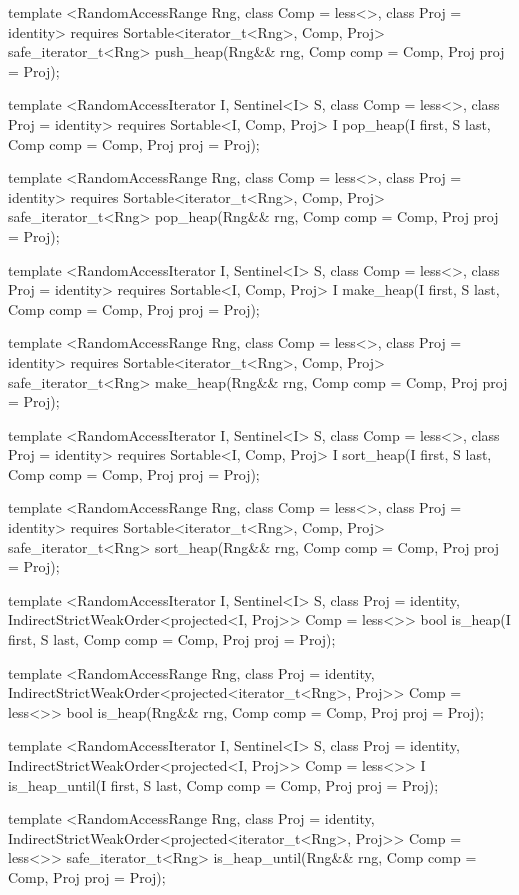 \begin{codeblock}
{{{{  template <RandomAccessRange Rng, class Comp = less<>, class Proj = identity>
    requires Sortable<iterator_t<Rng>, Comp, Proj>
    safe_iterator_t<Rng>
      push_heap(Rng&& rng, Comp comp = Comp{}, Proj proj = Proj{});

  template <RandomAccessIterator I, Sentinel<I> S, class Comp = less<>,
      class Proj = identity>
    requires Sortable<I, Comp, Proj>
    I pop_heap(I first, S last, Comp comp = Comp{}, Proj proj = Proj{});

  template <RandomAccessRange Rng, class Comp = less<>, class Proj = identity>
    requires Sortable<iterator_t<Rng>, Comp, Proj>
    safe_iterator_t<Rng>
      pop_heap(Rng&& rng, Comp comp = Comp{}, Proj proj = Proj{});

  template <RandomAccessIterator I, Sentinel<I> S, class Comp = less<>,
      class Proj = identity>
    requires Sortable<I, Comp, Proj>
    I make_heap(I first, S last, Comp comp = Comp{}, Proj proj = Proj{});

  template <RandomAccessRange Rng, class Comp = less<>, class Proj = identity>
    requires Sortable<iterator_t<Rng>, Comp, Proj>
    safe_iterator_t<Rng>
      make_heap(Rng&& rng, Comp comp = Comp{}, Proj proj = Proj{});

  template <RandomAccessIterator I, Sentinel<I> S, class Comp = less<>,
      class Proj = identity>
    requires Sortable<I, Comp, Proj>
    I sort_heap(I first, S last, Comp comp = Comp{}, Proj proj = Proj{});

  template <RandomAccessRange Rng, class Comp = less<>, class Proj = identity>
    requires Sortable<iterator_t<Rng>, Comp, Proj>
    safe_iterator_t<Rng>
      sort_heap(Rng&& rng, Comp comp = Comp{}, Proj proj = Proj{});

  template <RandomAccessIterator I, Sentinel<I> S, class Proj = identity,
      IndirectStrictWeakOrder<projected<I, Proj>> Comp = less<>>
    bool is_heap(I first, S last, Comp comp = Comp{}, Proj proj = Proj{});

  template <RandomAccessRange Rng, class Proj = identity,
      IndirectStrictWeakOrder<projected<iterator_t<Rng>, Proj>> Comp = less<>>
    bool
      is_heap(Rng&& rng, Comp comp = Comp{}, Proj proj = Proj{});

  template <RandomAccessIterator I, Sentinel<I> S, class Proj = identity,
      IndirectStrictWeakOrder<projected<I, Proj>> Comp = less<>>
    I is_heap_until(I first, S last, Comp comp = Comp{}, Proj proj = Proj{});

  template <RandomAccessRange Rng, class Proj = identity,
      IndirectStrictWeakOrder<projected<iterator_t<Rng>, Proj>> Comp = less<>>
    safe_iterator_t<Rng>
      is_heap_until(Rng&& rng, Comp comp = Comp{}, Proj proj = Proj{});

}}}}
\end{codeblock}
